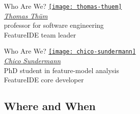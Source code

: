 \begin{frame}{\myframetitle}
	\begin{fancycolumns}[animation=none]
		\begin{note}{Who Are We?}
			\centering
			\href{https://www.uni-ulm.de/en/in/sp/team/thuem/}{\texttt{[image: thomas-thuem]}}\\[.5ex]
			\href{https://www.uni-ulm.de/en/in/sp/team/thuem/}{\emph{Thomas Thüm}}\\[.5ex]
			\small professor for software engineering\\[.5ex]
			FeatureIDE team leader
		\end{note}
	\nextcolumn
		\begin{note}{Who Are We?}
			\centering
			\href{https://www.uni-ulm.de/en/in/sp/team/chico-sundermann/}{\texttt{[image: chico-sundermann]}}\\[.5ex]
			\href{https://www.uni-ulm.de/en/in/sp/team/chico-sundermann/}{\emph{Chico Sundermann}}\\[.5ex]
			\small PhD student in feature-model analysis\\[.5ex]
			FeatureIDE core developer
		\end{note}
	\end{fancycolumns}
\end{frame}

\subsection{Where and When}

